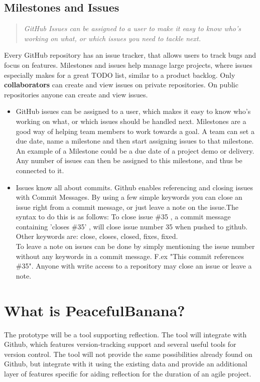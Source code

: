 \subsection{Milestones and Issues}
\begin{quote}
\em GitHub Issues can be assigned to a user to make it easy to know who's working on what, or which issues you need to tackle next.
\end{quote}
Every GitHub repository has an issue tracker, that allows users to track bugs and focus on features. Milestones and issues help manage large projects, where issues especially makes for a great TODO list, similar to a product backlog. Only {\bf collaborators} can create and view issues on private repositories. On public repositories anyone can create and view issues. 
\begin{itemize}
\item GitHub issues can be assigned to a user, which makes it easy to know who's working on what, or which issues should be handled next. Milestones are a good way of helping team members to work towards a goal. A team can set a due date, name a milestone and then start assigning issues to that milestone. An example of a Milestone could be a due date of a project demo or delivery. Any number of issues can then be assigned to this milestone, and thus be connected to it. 
\item Issues know all about commits. Github enables referencing and closing issues with Commit Messages. By using a few simple keywords you can close an issue right from a commit message, or just leave a note on the issue.The syntax to do this is as follows: To close issue \#35 , a commit message containing 'closes \#35' , will close issue number 35 when pushed to github. Other keywords are: close, closes, closed, fixes, fixed. \\
To leave a note on issues can be done by simply mentioning the issue number without any keywords in a commit message. F.ex "This commit references \#35". Anyone with write access to a repository may close an issue or leave a note.
\end{itemize}

\section{What is PeacefulBanana?}
The prototype will be a tool supporting reflection. The tool will integrate with Github, which features version-tracking support and several useful tools for version control. The tool will not provide the same possibilities already found on Github, but integrate with it using the existing data and provide an additional layer of features specific for aiding reflection for the duration of an agile project.

